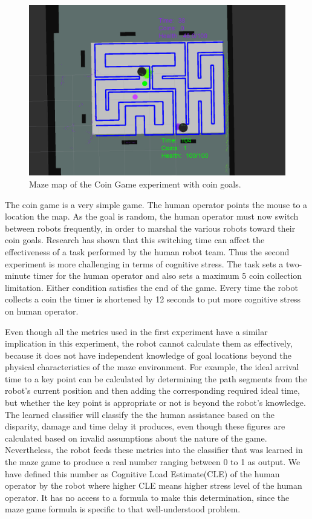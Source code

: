 \documentclass{sig-alternate}
\begin{document}
\begin{figure}  
\centering
\includegraphics[width=.5\textwidth]{coin_game_rviz.png}
\caption{Maze map of the Coin Game experiment with coin goals.}
\label{fig:coin_map}
\end{figure}

The coin game is a very simple game. The human operator points the
mouse to a location the map. As the goal is random, the human operator
must now switch between robots frequently, in order to marshal the
various robots toward their coin goals. Research
\cite{olsen2003metrics} has shown that this switching time can affect
the effectiveness of a task performed by the human robot team. Thus
the second experiment is more challenging in terms of cognitive
stress.  The task sets a two-minute timer for the human operator and
also sets a maximum 5 coin collection limitation. Either condition
satisfies the end of the game. Every time the robot collects a coin
the timer is shortened by 12 seconds to put more cognitive stress on
human operator.

Even though all the metrics used in the first experiment have a
similar implication in this experiment, the robot cannot calculate
them as effectively, because it does not have independent knowledge of
goal locations beyond the physical characteristics of the maze
environment. For example, the ideal arrival time to a key point can be
calculated by determining the path segments from the robot's current
position and then adding the corresponding required ideal time, but
whether the key point is appropriate or not is beyond the robot's
knowledge.  The learned classifier will classify the the human
assistance based on the disparity, damage and time delay it produces,
even though these figures are calculated based on invalid assumptions
about the nature of the game.  Nevertheless, the robot feeds these
metrics into the classifier that was learned in the maze game to
produce a real number ranging between 0 to 1 as output. We have defined this number as Cognitive Load Estimate(CLE) of the human operator by the robot where higher CLE means higher stress level of the human operator. It has no access to a formula to make this determination, since the maze game formula is specific to that well-understood problem.
\end{document}
